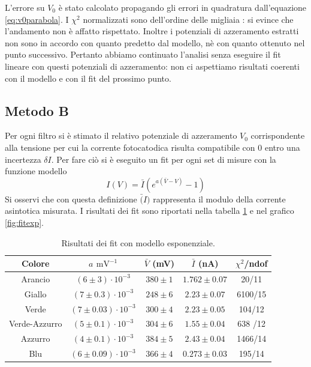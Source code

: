 \documentclass[10pt,a4paper]{article}
\begin{document}
L'errore su $V_0$ è stato calcolato propagando gli errori in quadratura dall'equazione \ref{eq:v0parabola}.
I $\chi ^2$ normalizzati sono dell'ordine delle migliaia : si evince che l'andamento non è affatto rispettato. Inoltre i potenziali di azzeramento estratti non sono in accordo con quanto predetto dal modello, nè con quanto ottenuto nel punto successivo. Pertanto  abbiamo continuato l'analisi senza eseguire il fit lineare con questi potenziali di azzeramento: non ci aspettiamo risultati coerenti con il modello e con il fit del prossimo punto.
\subsection{Metodo B}
Per ogni filtro si è stimato il relativo potenziale di azzeramento $V_0$ corrispondente alla tensione per cui la corrente fotocatodica risulta compatibile con 0 entro una incertezza $\delta I$. Per fare ciò si è eseguito un fit per ogni set di misure con la funzione modello
\begin{equation}\label{eq:fitexp}
I(V)=\bar{I}(e^{a(\bar{V}-V)}-1)
\end{equation}
Si osservi che con questa definizione $\bar(I)$ rappresenta il modulo della  corrente asintotica misurata.
I risultati dei fit sono riportati nella tabella \ref{tab:fitexp} e nel grafico \ref{fig:fitexp}.
\begin{table}[!htb]
\centering
\begin{tabular}{|c|c|c|c|c|}
\hline
Colore & $a$ $\mbox{mV}^{-1}$ &$\bar{V}$ (mV) & $\bar{I}$ (nA) & $\chi^2$/ndof\\
\hline
Arancio & $(6\pm 3)\cdot 10 ^{-3}$ & $380 \pm 1$ & $1.762\pm 0.07$ & 20/11\\
\hline
Giallo & $(7\pm 0.3) \cdot 10^{-3}$ & $248\pm 6$ & $2.23 \pm 0.07$ & 6100/15\\
\hline 
Verde & $(7 \pm 0.03)\cdot 10 ^ {-3}$ & $300 \pm 4$ & $2.23 \pm 0.05$ & 104/12 \\
\hline
Verde-Azzurro & $(5\pm 0.1)\cdot 10^{-3}$ & $304\pm 6$ & $1.55 \pm 0.04$ & 638 /12\\
\hline 
Azzurro & $(4 \pm 0.1)\cdot 10^{-3}$ & $384\pm 5$ & $2.43 \pm0.04$ & 1466/14\\
\hline
Blu & $(6\pm 0.09)\cdot 10^{-3} $ & $366\pm4$  &$0.273 \pm0.03$ & 195/14\\
\hline

\end{tabular}
\caption{Risultati dei fit con modello esponenziale.\label{tab:fitexp}}
\end{table}
\end{document}
